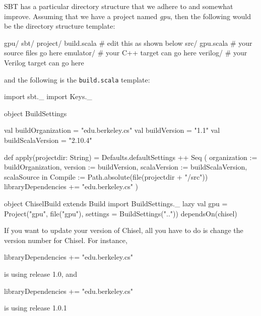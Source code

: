 \documentclass[twocolumn, 10pt]{article}
\begin{document}
SBT has a particular directory structure that we adhere to and
somewhat improve.  Assuming that we have a project named {\em gpu},
then the following would be the directory structure template:

\begin{bash}
gpu/
  sbt/
    project/
      build.scala # edit this as shown below
  src/ 
    gpu.scala     # your source files go here
  emulator/       # your C++ target can go here
  verilog/        # your Verilog target can go here
\end{bash}

\noindent
and the following is the \verb+build.scala+ template:

\begin{scala}
import sbt._
import Keys._

object BuildSettings {
  val buildOrganization = "edu.berkeley.cs"
  val buildVersion = "1.1"
  val buildScalaVersion = "2.10.4"

  def apply(projectdir: String) = {
    Defaults.defaultSettings ++ Seq (
      organization := buildOrganization,
      version      := buildVersion,
      scalaVersion := buildScalaVersion,
      scalaSource in Compile := 
        Path.absolute(file(projectdir + "/src"))
      libraryDependencies += 
        "edu.berkeley.cs" %
    )
  }
}

object ChiselBuild extends Build {
  import BuildSettings._
  lazy val gpu =
    Project("gpu", file("gpu"), 
            settings = BuildSettings("..")) 
      dependsOn(chisel)
}
\end{scala}

If you want to update your version of Chisel, all you have to do is
change the version number for Chisel.  For instance,

\begin{scala}
libraryDependencies += "edu.berkeley.cs" %
\end{scala}

\noindent
is using release 1.0, and

\begin{scala}
libraryDependencies += "edu.berkeley.cs" %
\end{scala}

\noindent
is using release 1.0.1
\end{document}
